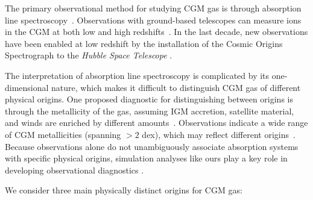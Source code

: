\documentclass[fleqn,usenatbib]{mnras}
\begin{document}
The primary observational method for studying CGM gas is through absorption line spectroscopy~\citep[e.g.,][]{Bahcall1969a}.
Observations with ground-based telescopes can measure ions in the CGM at both low and high redshifts~\citep[e.g.][]{2006ApJ...637..648S,2010ApJ...724L.176C, Steidel2010,Rudie2012, Kacprzak2012}.
In the last decade, new observations have been enabled at low redshift by the installation of the Cosmic Origins Spectrograph \citep{Green2012} to the \textit{Hubble Space Telescope} \citep[e.g.][]{Tumlinson2013,Werk2014,Liang2014,Johnson2017,Keeney2017}.

The interpretation of absorption line spectroscopy is complicated by its one-dimensional nature, which makes it difficult to distinguish CGM gas of  different physical origins.
One proposed diagnostic for distinguishing between origins is through the metallicity of the gas, assuming IGM accretion, satellite material, and winds are enriched by different amounts~\citep[e.g.][]{Lehner2013,Fox2013,Wotta2016,Fumagalli2016,Hafen2016,Lehner2016,Prochaska2017}.
Observations indicate a wide range of CGM metallicities (spanning $>2$ dex), which may reflect different origins~\citep[e.g.][though see Stern et al. 2016 who use multi-density ionization modeling and infer a significantly narrower metallicity distribution]{Lehner2013,Fumagalli2016,Wotta2016,Prochaska2017,Zahedy2018}.
Because observations alone do not unambiguously associate absorption systems with specific physical origins, simulation analyses like ours play a key role in developing observational diagnostics \citep[for a review of efforts in this area, see][]{2017ASSL..430..271F}.

We consider three main physically distinct origins for CGM gas:
\end{document}
